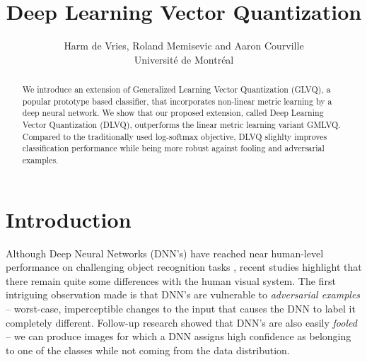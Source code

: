 \documentclass{esannV2}
\begin{document}
\title{Deep Learning Vector Quantization}

\author{Harm de Vries, Roland Memisevic and Aaron Courville
%
%
\vspace{.3cm}\\
%
Universit\'{e} de Montr\'{e}al \\
%
}

\maketitle

\begin{abstract}
We introduce an extension of Generalized Learning Vector Quantization (GLVQ), a popular prototype based classifier, that incorporates non-linear metric learning by a deep neural network. We show that our proposed extension, called Deep Learning Vector Quantization (DLVQ), outperforms the linear metric learning variant GMLVQ. Compared to the traditionally used log-softmax objective, DLVQ slighlty improves classification performance while being more robust against fooling and adversarial examples. 
\end{abstract}

\section{Introduction}
Although Deep Neural Networks (DNN's) \cite{DBLP:journals/corr/abs-1206-5538} have reached near human-level performance on challenging object recognition tasks \cite{krizhevsky2012imagenet,DBLP:journals/corr/IoffeS15}, recent studies  highlight that there remain quite some differences with the human visual system. The first intriguing observation made is that DNN's are vulnerable to \emph{adversarial examples} \cite{DBLP:journals/corr/SzegedyZSBEGF13} -- worst-case, imperceptible changes to the input that causes the DNN to label it completely different. Follow-up research \cite{DBLP:journals/corr/NguyenYC14} showed that DNN's are also easily \emph{fooled} -- we can produce images for which a DNN assigns high confidence as belonging to one of the classes while not coming from the data distribution. 
\end{document}
